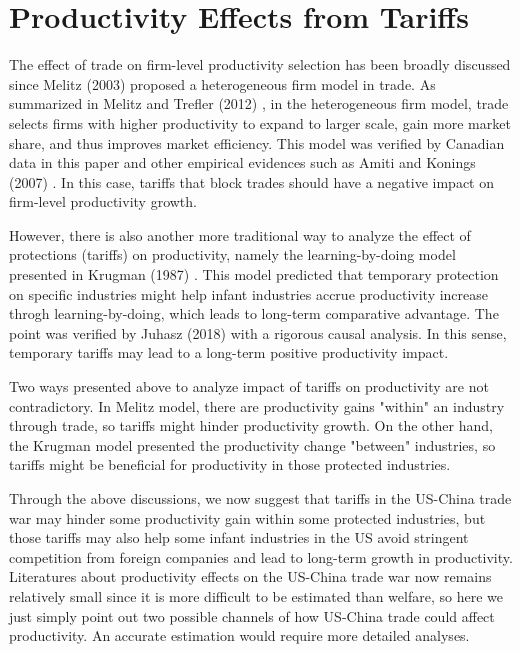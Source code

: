 \documentclass[12pt]{article}
\begin{document}
\section{Productivity Effects from Tariffs}
\label{sec:productivity}
The effect of trade on firm-level productivity selection has been broadly discussed since Melitz (2003) \cite{melitz2003impact} proposed a heterogeneous firm model in trade.
As summarized in Melitz and Trefler (2012) \cite{melitz2012gains}, in the heterogeneous firm model, trade selects firms with higher productivity to expand to larger scale, gain more market share, and thus improves market efficiency. 
This model was verified by Canadian data in this paper and other empirical evidences such as Amiti and Konings (2007) \cite{amiti2007trade}.
In this case, tariffs that block trades should have a negative impact on firm-level productivity growth. 

However, there is also another more traditional way to analyze the effect of protections (tariffs) on productivity, namely the learning-by-doing model presented in Krugman (1987) \cite{krugman1987narrow}. 
This model predicted that temporary protection on specific industries might help infant industries accrue productivity increase throgh learning-by-doing, which leads to long-term comparative advantage.
The point was verified by Juhasz (2018) \cite{juhasz2018temporary} with a rigorous causal analysis.
In this sense, temporary tariffs may lead to a long-term positive productivity impact.

Two ways presented above to analyze impact of tariffs on productivity are not contradictory. 
In Melitz model, there are productivity gains "within" an industry through trade, so tariffs might hinder productivity growth.
On the other hand, the Krugman model presented the productivity change "between" industries, so tariffs might be beneficial for productivity in those protected industries.

Through the above discussions, we now suggest that tariffs in the US-China trade war may hinder some productivity gain within some protected industries, 
but those tariffs may also help some infant industries in the US avoid stringent competition from foreign companies and lead to long-term growth in productivity. 
Literatures about productivity effects on the US-China trade war now remains relatively small since it is more difficult to be estimated than welfare, 
so here we just simply point out two possible channels of how US-China trade could affect productivity. An accurate estimation would require more detailed analyses.
\end{document}
